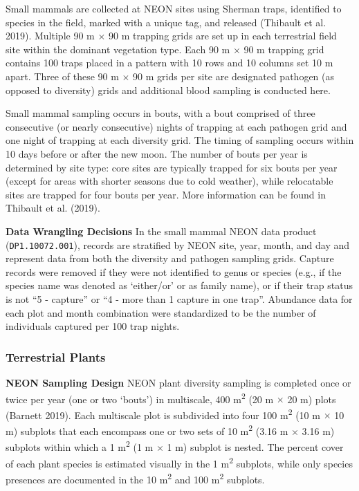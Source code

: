 \documentclass[
  12pt,
]{article}
\begin{document}
Small mammals are collected at NEON sites using Sherman traps, identified to species in the field, marked with a unique tag, and released (Thibault et al. 2019). Multiple 90 m \(\times\) 90 m trapping grids are set up in each terrestrial field site within the dominant vegetation type. Each 90 m \(\times\) 90 m trapping grid contains 100 traps placed in a pattern with 10 rows and 10 columns set 10 m apart. Three of these 90 m \(\times\) 90 m grids per site are designated pathogen (as opposed to diversity) grids and additional blood sampling is conducted here.

Small mammal sampling occurs in bouts, with a bout comprised of three consecutive (or nearly consecutive) nights of trapping at each pathogen grid and one night of trapping at each diversity grid. The timing of sampling occurs within 10 days before or after the new moon. The number of bouts per year is determined by site type: core sites are typically trapped for six bouts per year (except for areas with shorter seasons due to cold weather), while relocatable sites are trapped for four bouts per year. More information can be found in Thibault et al. (2019).

\textbf{Data Wrangling Decisions} In the small mammal NEON data product (\texttt{DP1.10072.001}), records are stratified by NEON site, year, month, and day and represent data from both the diversity and pathogen sampling grids. Capture records were removed if they were not identified to genus or species (e.g., if the species name was denoted as `either/or' or as family name), or if their trap status is not ``5 - capture'' or ``4 - more than 1 capture in one trap''. Abundance data for each plot and month combination were standardized to be the number of individuals captured per 100 trap nights.

\hypertarget{terrestrial-plants}{%
\subsubsection{Terrestrial Plants}\label{terrestrial-plants}}

\textbf{NEON Sampling Design} NEON plant diversity sampling is completed once or twice per year (one or two `bouts') in multiscale, 400 m\textsuperscript{2} (20 m \(\times\) 20 m) plots (Barnett 2019). Each multiscale plot is subdivided into four 100 m\textsuperscript{2} (10 m \(\times\) 10 m) subplots that each encompass one or two sets of 10 m\textsuperscript{2} (3.16 m \(\times\) 3.16 m) subplots within which a 1 m\textsuperscript{2} (1 m \(\times\) 1 m) subplot is nested. The percent cover of each plant species is estimated visually in the 1 m\textsuperscript{2} subplots, while only species presences are documented in the 10 m\textsuperscript{2} and 100 m\textsuperscript{2} subplots.
\end{document}
